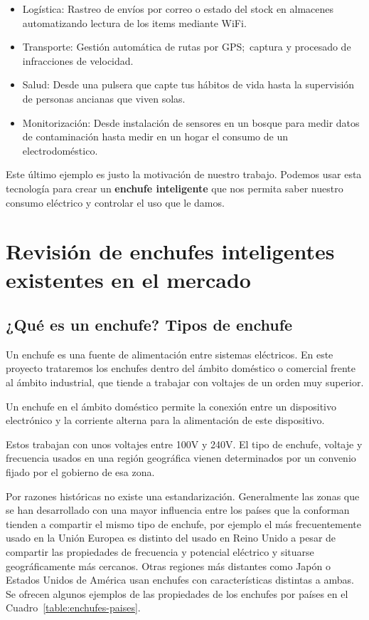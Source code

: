 \documentclass[a4paper,10pt]{article}
\begin{document}
\begin{itemize}
\item
  Logística: Rastreo de envíos por correo o estado del stock en
  almacenes automatizando lectura de los items mediante WiFi.
\item
  Transporte: Gestión automática de rutas por GPS;\ captura y procesado
  de infracciones de velocidad.
\item
  Salud: Desde una pulsera que capte tus hábitos de vida hasta
  la supervisión de personas ancianas que viven solas.
\item
  Monitorización: Desde instalación de sensores en un bosque para medir
  datos de contaminación hasta medir en un hogar el consumo de un
  electrodoméstico.
\end{itemize}

Este último ejemplo es justo la motivación de nuestro trabajo. Podemos
usar esta tecnología para crear un \textbf{enchufe inteligente} que
nos permita saber nuestro consumo eléctrico y controlar el uso que le
damos.

\newpage

\section{Revisión de enchufes inteligentes existentes en el
mercado}\label{revision-enchufes}

\subsection{¿Qué es un enchufe? Tipos de
enchufe}\label{tipos-de-enchufe}

Un enchufe es una fuente de alimentación entre sistemas eléctricos. En
este proyecto trataremos los enchufes dentro del ámbito doméstico o
comercial frente al ámbito industrial, que tiende a trabajar con
voltajes de un orden muy superior.

Un enchufe en el ámbito doméstico permite la conexión entre un
dispositivo electrónico y la corriente alterna para la alimentación de
este dispositivo.

Estos trabajan con unos voltajes entre 100V y
240V.\cite{iecIECWorldPlugs} El tipo de enchufe, voltaje y frecuencia
usados en una región geográfica vienen determinados por un convenio
fijado por el gobierno de esa zona.

Por razones históricas\cite{nuevatribunaOrigenFrecuenciasElectricas}
no existe una estandarización. Generalmente las zonas que se han
desarrollado con una mayor influencia entre los países que la
conforman tienden a compartir el mismo tipo de enchufe, por ejemplo el
más frecuentemente usado en la Unión Europea es distinto del usado en
Reino Unido a pesar de compartir las propiedades de frecuencia y
potencial eléctrico y situarse geográficamente más cercanos. Otras
regiones más distantes como Japón o Estados Unidos de América usan
enchufes con características distintas a ambas. Se ofrecen algunos
ejemplos de las propiedades de los enchufes por países en el
Cuadro~\ref{table:enchufes-paises}.
\end{document}
